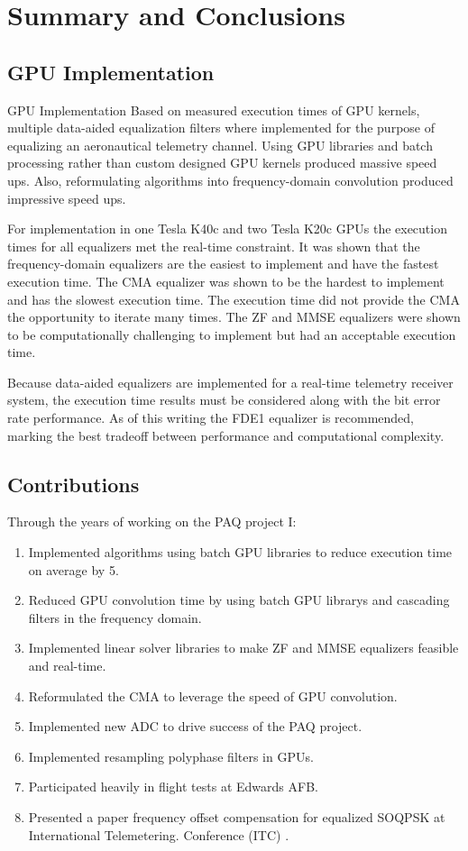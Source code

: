 \chapter{Summary and Conclusions}
\label{chap:final_summary}
\section{GPU Implementation}
GPU Implementation
Based on measured execution times of GPU kernels, multiple data-aided equalization filters where implemented for the purpose of equalizing an aeronautical telemetry channel.
Using GPU libraries and batch processing rather than custom designed GPU kernels produced massive speed ups.
Also, reformulating algorithms into frequency-domain convolution produced impressive speed ups.

For implementation in one Tesla K40c and two Tesla K20c GPUs the execution times for all equalizers met the real-time constraint.
It was shown that the frequency-domain equalizers are the easiest to implement and have the fastest execution time.
The CMA equalizer was shown to be the hardest to implement and has the slowest execution time.
The execution time did not provide the CMA the opportunity to iterate many times.
The ZF and MMSE equalizers were shown to be computationally challenging to implement but had an acceptable execution time.

Because data-aided equalizers are implemented for a real-time telemetry receiver system,
the execution time results must be considered along with the bit error rate performance.
As of this writing the FDE1 equalizer is recommended, marking the best tradeoff between performance and computational complexity.

\section{Contributions}
Through the years of working on the PAQ project I:
\begin{enumerate}
\item Implemented algorithms using batch GPU libraries to reduce execution time on average by 5.
\item Reduced GPU convolution time by using batch GPU librarys and cascading filters in the frequency domain.
\item Implemented linear solver libraries to make ZF and MMSE equalizers feasible and real-time.
\item Reformulated the CMA to leverage the speed of GPU convolution.
\item Implemented new ADC to drive success of the PAQ project.
\item Implemented resampling polyphase filters in GPUs.
\item Participated heavily in flight tests at Edwards AFB.
\item Presented a paper frequency offset compensation for equalized SOQPSK at International \newline Telemetering. Conference (ITC) \cite{ravert2016}.
\end{enumerate}

